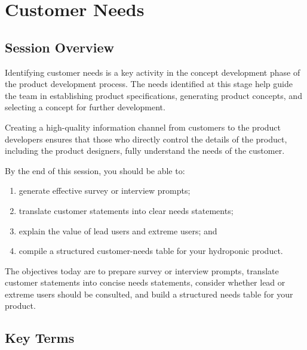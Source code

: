 \chapter{Customer Needs}
\label{sec:customer_needs}
\section{Session Overview}

Identifying customer needs is a key activity in the concept development phase of the product development process. The needs identified at this stage help guide the team in establishing product specifications, generating product concepts, and selecting a concept for further development.

Creating a high-quality information channel from customers to the product developers ensures that those who directly control the details of the product, including the product designers, fully understand the needs of the customer.



By the end of this session, you should be able to:
\begin{enumerate}
    \item generate effective survey or interview prompts;
    \item translate customer statements into clear needs statements;
    \item explain the value of lead users and extreme users; and
    \item compile a structured customer-needs table for your hydroponic product.
\end{enumerate}

\begin{tcolorbox}[title=Goal]
The objectives today are to prepare survey or interview prompts, translate customer statements into concise needs statements, consider whether lead or extreme users should be consulted, and build a structured needs table for your product.
\end{tcolorbox}

\section{Key Terms}

